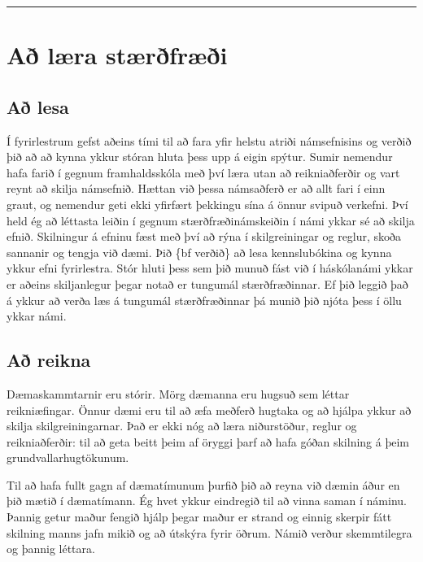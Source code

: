 \documentclass[b5paper,10pt,icelandic]{sphinxmanual}
\begin{document}
\newpage


\bigskip\hrule\bigskip



\section{Að læra stærðfræði}
\label{\detokenize{vidauki:a-laera-staerfraei}}


\subsection{Að lesa}
\label{\detokenize{vidauki:a-lesa}}
Í fyrirlestrum gefst aðeins
tími til að fara yfir helstu atriði námsefnisins og verðið þið að
að kynna ykkur stóran hluta þess upp á eigin spýtur. Sumir nemendur
hafa farið í gegnum framhaldsskóla með því
læra utan að reikniaðferðir og vart reynt að skilja námsefnið.  Hættan
við þessa námsaðferð er að allt fari
í einn graut, og
nemendur geti ekki yfirfært þekkingu sína á önnur svipuð verkefni.
Því held ég að léttasta leiðin í gegnum stærðfræðinámskeiðin í námi
ykkar sé að skilja efnið.  Skilningur á efninu fæst með því að rýna í
skilgreiningar og reglur, skoða sannanir og tengja við dæmi.
Þið \{bf verðið\} að lesa
kennslubókina og kynna ykkur efni fyrirlestra.
Stór hluti þess sem þið munuð fást við í
háskólanámi ykkar er aðeins skiljanlegur þegar notað er tungumál
stærðfræðinnar.  Ef þið leggið það á ykkur að verða læs á tungumál
stærðfræðinnar þá munið þið njóta þess í öllu ykkar námi.


\subsection{Að reikna}
\label{\detokenize{vidauki:a-reikna}}
Dæmaskammtarnir eru stórir.  Mörg dæmanna eru hugsuð
sem léttar reikniæfingar.
Önnur dæmi eru til að æfa
meðferð hugtaka og að hjálpa ykkur að skilja
skilgreiningarnar.  Það er ekki nóg að læra niðurstöður, reglur og
reikniaðferðir: til að geta beitt þeim af öryggi þarf að hafa góðan
skilning á þeim grundvallarhugtökunum.

Til að hafa fullt gagn af dæmatímunum þurfið þið að reyna við dæmin
áður en þið mætið í dæmatímann.
Ég hvet ykkur eindregið til að vinna saman í náminu.  Þannig getur
maður fengið hjálp þegar maður er strand og
einnig skerpir fátt skilning manns  jafn mikið og að útskýra
fyrir öðrum.  Námið verður  skemmtilegra og þannig
léttara.
\end{document}
